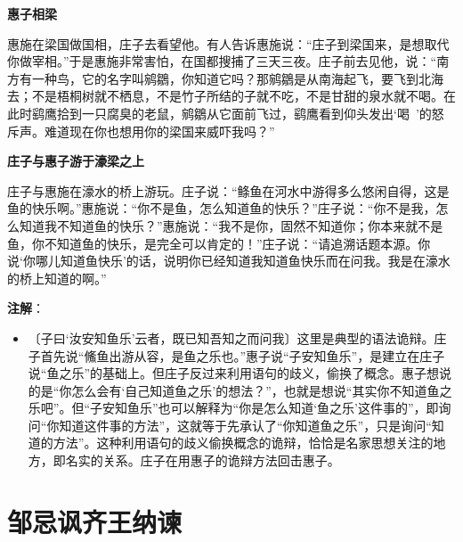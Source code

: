 \documentclass[12pt,UTF-8,openany,a4]{ctexbook}
\begin{document}
\begin{large}\yiwen
    
    \begin{center}{\Large\textbf{惠子相梁}}\end{center}
    
    惠施在梁国做国相，庄子去看望他。有人告诉惠施说：“庄子到梁国来，是想取代你做宰相。”于是惠施非常害怕，在国都搜捕了三天三夜。庄子前去见他，说：“南方有一种鸟，它的名字叫鹓鶵，你知道它吗？那鹓鶵是从南海起飞，要飞到北海去；不是梧桐树就不栖息，不是竹子所结的子就不吃，不是甘甜的泉水就不喝。在此时鹞鹰拾到一只腐臭的老鼠，鹓鶵从它面前飞过，鹞鹰看到仰头发出‘喝~’的怒斥声。难道现在你也想用你的梁国来威吓我吗？”
    
    \begin{center}{\Large\textbf{庄子与惠子游于濠梁之上}}\end{center}
    
    庄子与惠施在濠水的桥上游玩。庄子说：“鲦鱼在河水中游得多么悠闲自得，这是鱼的快乐啊。”惠施说：“你不是鱼，怎么知道鱼的快乐？”庄子说：“你不是我，怎么知道我不知道鱼的快乐？”惠施说：“我不是你，固然不知道你；你本来就不是鱼，你不知道鱼的快乐，是完全可以肯定的！”庄子说：“请追溯话题本源。你说‘你哪儿知道鱼快乐’的话，说明你已经知道我知道鱼快乐而在问我。我是在濠水的桥上知道的啊。”
    

\end{large}


\newpage

\begin{Large}
   \noindent \textbf{注解}：
\end{Large}

\vspace{-1em}

\begin{itemize}
    \setlength\itemsep{-0.2em}
    \item〔子曰‘汝安知鱼乐’云者，既已知吾知之而问我〕{\yiwen 这里是典型的语法诡辩。庄子首先说“鯈鱼出游从容，是鱼之乐也。”惠子说“子安知鱼乐”，是建立在庄子说“鱼之乐”的基础上。但庄子反过来利用语句的歧义，偷换了概念。惠子想说的是“你怎么会有‘自己知道鱼之乐’的想法？”，也就是想说“其实你不知道鱼之乐吧”。但“子安知鱼乐”也可以解释为“你是怎么知道‘鱼之乐’这件事的”，即询问“你知道这件事的方法”，这就等于先承认了“你知道鱼之乐”，只是询问“知道的方法”。这种利用语句的歧义偷换概念的诡辩，恰恰是名家思想关注的地方，即名实的关系。庄子在用惠子的诡辩方法回击惠子。}
\end{itemize}

\chapter{邹忌讽齐王纳谏}
\end{document}
